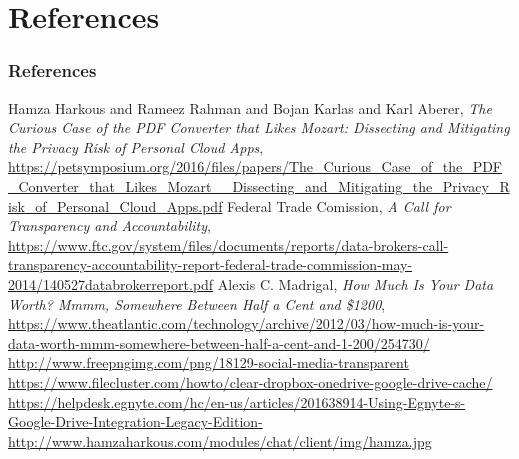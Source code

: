 \documentclass{beamer}
\begin{document}
\section{References}
\begin{frame}[allowframebreaks]
\frametitle{References}
\small{
\begin{thebibliography}{99} 
  Hamza Harkous and Rameez Rahman and Bojan Karlas and Karl Aberer, \emph{The Curious Case of the PDF Converter that Likes Mozart: Dissecting and Mitigating the Privacy Risk of Personal Cloud Apps}, \url{https://petsymposium.org/2016/files/papers/The\_Curious\_Case\_of\_the\_PDF\_Converter\_that\_Likes\_Mozart\_\_Dissecting\_and\_Mitigating\_the\_Privacy\_Risk\_of\_Personal\_Cloud\_Apps.pdf}
  Federal Trade Comission, \emph{A Call for Transparency and Accountability}, \url{https://www.ftc.gov/system/files/documents/reports/data-brokers-call-transparency-accountability-report-federal-trade-commission-may-2014/140527databrokerreport.pdf}
  Alexis C. Madrigal, \emph{How Much Is Your Data Worth? Mmmm, Somewhere Between Half a Cent and \$1200}, \url{https://www.theatlantic.com/technology/archive/2012/03/how-much-is-your-data-worth-mmm-somewhere-between-half-a-cent-and-1-200/254730/}
  \url{http://www.freepngimg.com/png/18129-social-media-transparent}
  \url{https://www.filecluster.com/howto/clear-dropbox-onedrive-google-drive-cache/}
  \url{https://helpdesk.egnyte.com/hc/en-us/articles/201638914-Using-Egnyte-s-Google-Drive-Integration-Legacy-Edition-}
  \url{http://www.hamzaharkous.com/modules/chat/client/img/hamza.jpg}
\end{thebibliography}
}
\end{frame}
\end{document}
